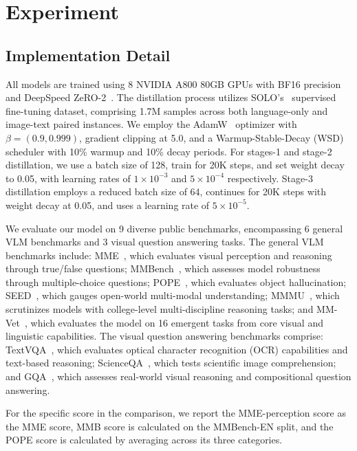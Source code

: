 

\section{Experiment}
\subsection{Implementation Detail}


All models are trained using 8 NVIDIA A800 80GB GPUs with BF16 precision and DeepSpeed ZeRO-2~\cite{rajbhandari2020zero,rasley2020deepspeed}. The distillation process utilizes SOLO's~\cite{solo} supervised fine-tuning dataset, comprising 1.7M samples across both language-only and image-text paired instances. We employ the AdamW~\cite{adamw} optimizer with $\beta=(0.9,0.999)$, gradient clipping at 5.0, and a Warmup-Stable-Decay (WSD) scheduler with 10\% warmup and 10\% decay periods. For stages-1 and stage-2 distillation, we use a batch size of 128, train for 20K steps, and set weight decay to 0.05, with learning rates of $1 \times 10^{-3}$ and $5 \times 10^{-4}$ respectively. Stage-3 distillation employs a reduced batch size of 64, continues for 20K steps with weight decay at 0.05, and uses a learning rate of $5 \times 10^{-5}$.



We evaluate our model on 9 diverse public benchmarks, encompassing 6 general VLM benchmarks and 3 visual question answering tasks. 
The general VLM benchmarks include: MME~\cite{mme}, which evaluates visual perception and reasoning through true/false questions; 
MMBench~\cite{mmb}, which assesses model robustness through multiple-choice questions; 
POPE~\cite{pope}, which evaluates object hallucination; 
SEED~\cite{seed}, which gauges open-world multi-modal understanding; 
MMMU~\cite{mmmu}, which scrutinizes models with college-level multi-discipline reasoning tasks;
and MM-Vet~\cite{mmvet}, which evaluates the model on 16 emergent tasks from core visual and linguistic capabilities.
The visual question answering benchmarks comprise: TextVQA~\cite{textvqa}, which evaluates optical character recognition (OCR) capabilities and text-based reasoning; 
ScienceQA~\cite{sqa}, which tests scientific image comprehension; 
and GQA~\cite{gqa}, which assesses real-world visual reasoning and compositional question answering.

For the specific score in the comparison, we report the MME-perception score as the MME score, MMB score is calculated on the MMBench-EN split, and the POPE score is calculated by averaging across its three categories.

